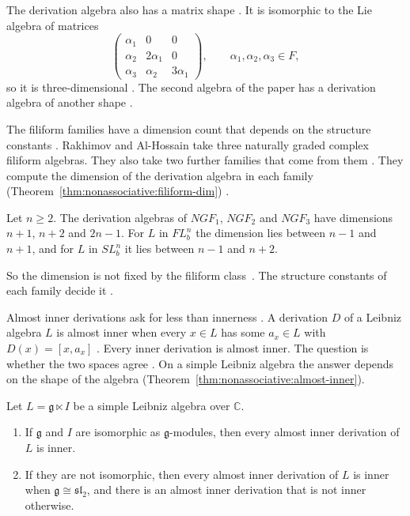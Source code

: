 The derivation algebra also has a matrix shape
\cite[Theorem~3.1, pp.~821--822]{KurdachenkoSemkoYashchuk2024}. It is isomorphic to the Lie
algebra of matrices
\[
\begin{pmatrix}\alpha_1&0&0\\ \alpha_2&2\alpha_1&0\\ \alpha_3&\alpha_2&3\alpha_1\end{pmatrix},
\qquad \alpha_1,\alpha_2,\alpha_3\in F,
\]
so it is three-dimensional
\cite[Theorem~3.1, pp.~821--822]{KurdachenkoSemkoYashchuk2024}. The second algebra
of the paper has a derivation algebra of another shape
\cite[Theorem~3.2, p.~825]{KurdachenkoSemkoYashchuk2024}.

The filiform families have a dimension count that depends on the structure
constants \cite[Theorem~1, p.~3]{RakhimovAlHossain2012}. Rakhimov and
Al-Hossain take three naturally graded complex filiform algebras. They also
take two further families that come from them \cite[Theorem~1,
p.~3]{RakhimovAlHossain2012}. They compute the dimension of the derivation
algebra in each family (Theorem~\ref{thm:nonassociative:filiform-dim})
\cite[Theorems~3--5, pp.~4, 8
and~12]{RakhimovAlHossain2012}.\begin{theorem}\label{thm:nonassociative:filiform-dim} Let
$n\geq2$. The derivation algebras of $NGF_1$, $NGF_2$ and $NGF_3$ have
dimensions $n+1$, $n+2$ and $2n-1$. For $L$ in $FL_b^n$ the dimension lies
between $n-1$ and $n+1$, and for $L$ in $SL_b^n$ it lies between $n-1$ and
$n+2$. \end{theorem}

So the dimension is not fixed by the filiform class~\cite[pp.~8--12]{RakhimovAlHossain2012}. The structure constants
of each family decide it \cite[pp.~8--12]{RakhimovAlHossain2012}.

Almost inner derivations ask for less than innerness \cite[Definition~2.4,
p.~1526]{Kurbanbaev2025}. A derivation $D$ of a Leibniz algebra $L$ is almost
inner when every $x\in L$ has some $a_x\in L$ with $D(x)=[x,a_x]$
\cite[Definition~2.4, p.~1526]{Kurbanbaev2025}. Every inner derivation is
almost inner. The question is whether the two spaces agree
\cite[p.~1527]{Kurbanbaev2025}. On a simple Leibniz algebra the answer depends
on the shape of the algebra (Theorem~\ref{thm:nonassociative:almost-inner}).

\begin{theorem}\label{thm:nonassociative:almost-inner}
Let $L=\mathfrak{g}\ltimes I$ be a simple Leibniz algebra over $\mathbb{C}$.
\begin{enumerate}
\item If $\mathfrak{g}$ and $I$ are isomorphic as $\mathfrak{g}$-modules, then
every almost inner derivation of $L$ is inner.
\item If they are not isomorphic, then every almost inner derivation of $L$ is
inner when $\mathfrak{g}\cong\mathfrak{sl}_2$, and there is an almost inner
derivation that is not inner otherwise.
\end{enumerate}
\end{theorem}

